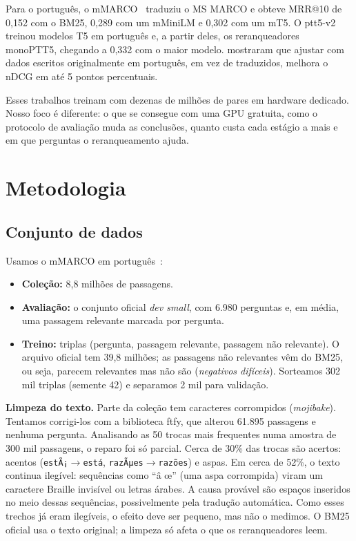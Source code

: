 \documentclass[12pt]{article}
\begin{document}
Para o português, o mMARCO~\cite{bonifacio:2021} traduziu o MS MARCO e obteve MRR@10 de 0,152
com o BM25, 0,289 com um mMiniLM e 0,302 com um mT5. O ptt5-v2~\cite{piau:2024} treinou modelos
T5 em português e, a partir deles, os reranqueadores monoPTT5, chegando a 0,332 com o maior
modelo. \cite{miyaji:2026} mostraram que ajustar com dados escritos originalmente em português,
em vez de traduzidos, melhora o nDCG em até 5 pontos percentuais.

Esses trabalhos treinam com dezenas de milhões de pares em hardware dedicado. Nosso foco é
diferente: o que se consegue com uma GPU gratuita, como o protocolo de avaliação muda as
conclusões, quanto custa cada estágio a mais e em que perguntas o reranqueamento ajuda.

\section{Metodologia}
\label{sec:metodo}

\subsection{Conjunto de dados}

Usamos o mMARCO em português~\cite{bonifacio:2021}:
\begin{itemize}
  \item \textbf{Coleção:} 8,8 milhões de passagens.
  \item \textbf{Avaliação:} o conjunto oficial \textit{dev small}, com 6.980 perguntas e,
  em média, uma passagem relevante marcada por pergunta.
  \item \textbf{Treino:} triplas (pergunta, passagem relevante, passagem não relevante). O
  arquivo oficial tem 39,8 milhões; as passagens não relevantes vêm do BM25, ou seja,
  parecem relevantes mas não são (\emph{negativos difíceis}). Sorteamos 302 mil triplas
  (semente 42) e separamos 2 mil para validação.
\end{itemize}

\textbf{Limpeza do texto.} Parte da coleção tem caracteres corrompidos
(\textit{mojibake}). Tentamos corrigi-los com a biblioteca ftfy, que alterou 61.895
passagens e nenhuma pergunta. Analisando as 50 trocas mais frequentes numa amostra de 300 mil
passagens, o reparo foi só parcial. Cerca de 30\% das trocas são acertos: acentos
(\texttt{estÃ¡}$\rightarrow$\texttt{está}, \texttt{razÃµes}$\rightarrow$\texttt{razões}) e
aspas. Em cerca de 52\%, o texto continua ilegível: sequências como ``â \texteuro{} œ'' (uma
aspa corrompida) viram um caractere Braille invisível ou letras árabes. A causa provável são
espaços inseridos no meio dessas sequências, possivelmente pela tradução automática. Como
esses trechos já eram ilegíveis, o efeito deve ser pequeno, mas não o medimos. O BM25 oficial
usa o texto original; a limpeza só afeta o que os reranqueadores leem.
\end{document}
